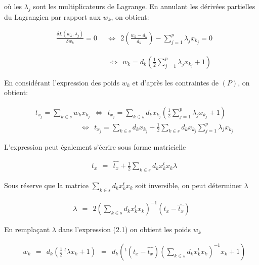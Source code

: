 \documentclass[11pt,fleqn]{book} %
\begin{document}
où les $\lambda_j$ sont les multiplicateurs de Lagrange. En annulant les dérivées partielles du Lagrangien par rapport aux $w_k$, on obtient: 

\begin{align*}
&  \frac{\delta L(w_k,\lambda_j)}{\delta w_k}=0 \:\:\:\:\:\:	\Leftrightarrow\:\: 2\left(\frac{w_k-d_k}{d_k}\right)-\sum_{j=1}^p \lambda_j x_{k_j}=0 
\end{align*}


\begin{align}
& \quad\quad\quad\quad\quad\quad\quad\: \Leftrightarrow \:\: w_k=d_k\left( \frac{1}{2} \sum_{j=1}^p \lambda_j x_{k_j} +1 \right) 
\end{align}


En considérant l'expression des poids $w_k$ et d'après les contraintes de $(P)$, on obtient:

\begin{align*}
& t_{x_j} = \sum_{k\in s} w_k x_{k_j} \:\:  \Leftrightarrow \:\:  t_{x_j} = \sum_{k\in s} d_k  x_{k_j} \left( \frac{1}{2} \sum_{j=1}^p \lambda_j x_{k_j} +1 \right)\\
& \quad\quad\quad\quad\quad\:\:\:\:\:\: \Leftrightarrow \:\:  t_{x_j} = \sum_{k\in s} d_k  x_{k_j} +  \frac{1}{2} \sum_{k\in s} d_k  x_{k_j} \sum_{j=1}^p \lambda_j x_{k_j}
\end{align*}

L'expression peut également s'écrire sous forme matricielle



\begin{align*}
& t_x \:\:=\:\: \hat{t_x} +\frac{1}{2}\sum_{k\in s} d_k x_k ^t x_k \lambda
\end{align*}

Sous réserve que la matrice $\sum_{k\in s} d_k x_k ^t x_k$ soit inversible, on peut déterminer $\lambda$

\begin{align*}
\lambda\:\:=\:\:2\left( \sum_{k\in s} d_k x_k ^t x_k \right)^{-1}(t_x-\hat{t_x})
\end{align*}

En remplaçant $\lambda$ dans l'expression (2.1) on obtient les poids $w_k$

\begin{align}
& w_k\:\:=\:\:d_k\left(\frac{1}{2}\: ^t\lambda x_k +1\right)\:\: = \:\: d_k \left( ^t(t_x-\hat{t_x}) \left( \sum_{k\in s} d_k x_k ^t x_k \right)^{-1} x_k + 1 \right)
\end{align}
\end{document}
